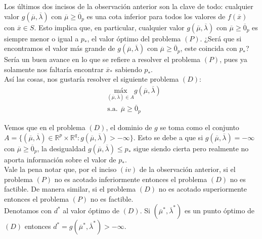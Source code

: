 \documentclass[11pt]{report}
\newcommand{\Rp}{\mathbb{R}^{p}}
\newcommand{\Rq}{\mathbb{R}^{q}}
\newcommand{\mv}{\overline{\mu}}
\newcommand{\lv}{\overline{\lambda}}
\newcommand{\x}{\overline{x}}
\newcommand{\zp}{\overline{0}_{p}}
\newcommand{\po}{p_{*}}
\newcommand{\xo}{\overline{x}_{*}}
\newcommand{\deo}{d^{*}}
\newcommand{\muo}{\overline{\mu}^{*}}
\newcommand{\lao}{\overline{\lambda}^{*}}
\newcommand{\mlo}{(\overline{\mu}^{*},\overline{\lambda}^{*})}
\begin{document}
Los últimos dos incisos de la observación anterior son la clave de todo: cualquier valor $g(\mv,\lv)$ con $\mv\geq\zp$ es una cota inferior para todos los valores de $f(\x)$ con $\x\in S$. Esto implica que, en particular, cualquier valor $g(\mv,\lv)$ con $\mv\geq\zp$ es siempre menor o igual a $\po$, el valor óptimo del problema $(P)$. ¿Será que si encontramos el valor más grande de $g(\mv,\lv)$ con $\mv\geq\zp$, este coincida con $\po$? Sería un buen avance en lo que se refiere a resolver el problema $(P)$, pues ya solamente nos faltaría encontrar $\xo$ sabiendo $\po$.\\

Así las cosas, nos gustaría resolver el siguiente problema $(D)$:
\begin{equation*}
\begin{aligned}
& \underset{(\mv,\lv)\in A}{\text{máx}} g(\mv,\lv) \\
& \text{s.a.}\ \ \mv\geq\zp
\end{aligned}
\end{equation*}

 Vemos que en el problema $(D)$, el dominio de $g$ se toma como el conjunto $A=\{(\mv,\lv)\in\Rp\times\Rq: g(\mv,\lv)>-\infty\}$. Esto se debe a que si $g(\mv,\lv)=-\infty$ con $\mv\geq\zp$, la desigualdad $g(\mv,\lv)\leq\po$ sigue siendo cierta pero realmente no aporta información sobre el valor de $\po$.\\


 Vale la pena notar que, por el inciso $(iv)$ de la observación anterior, si el problema $(P)$ no es acotado inferiormente entonces el problema $(D)$ no es factible. De manera similar, si el problema $(D)$ no es acotado superiormente entonces el problema $(P)$ no es factible.\\


 Denotamos con $\deo$ al valor óptimo de $(D)$. Si $(\muo, \lao)$ es un punto óptimo de $(D)$ entonces $\deo=g\mlo>-\infty$.\\
\end{document}
